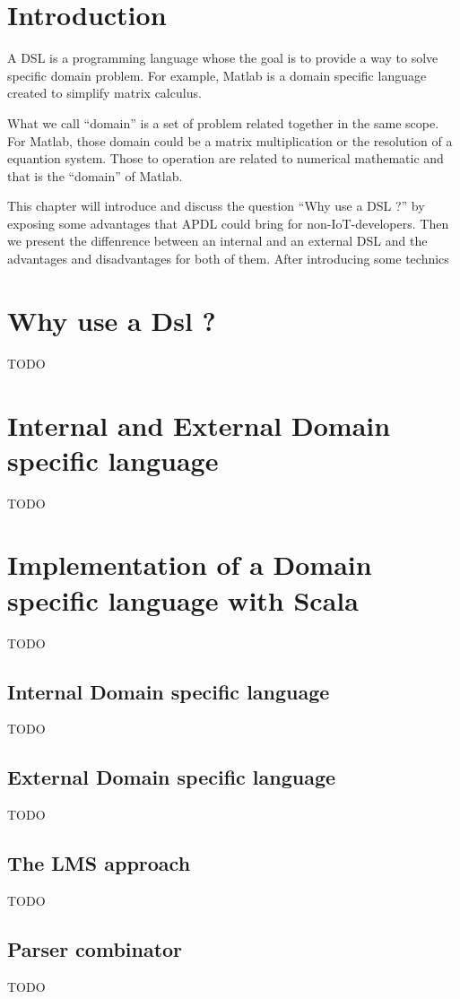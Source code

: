 \label{cha:a-dsl}

\section{Introduction}
\label{sec:dsl_intro}

A \gls{DSL} is a programming language whose the goal is
to provide a way to solve specific domain problem. For example, Matlab is a
domain specific language created to simplify matrix calculus.

What we call ``domain'' is a set of problem related together in the same scope.
For Matlab, those domain could be a matrix multiplication or the resolution of a
equantion system. Those to operation are related to numerical mathematic and
that is the ``domain'' of Matlab.

This chapter will introduce and discuss the question ``Why use a DSL ?'' by
exposing some advantages that \gls{APDL} could bring for non-IoT-developers.
Then we present the diffenrence between an internal and an external DSL and the
advantages and disadvantages for both of them. After introducing some technics

\section{Why use a Dsl ?}
\label{sec:why-use-dsl}

TODO

\section{Internal and External Domain specific language}
\label{sec:internal_and_external_dsl}

TODO

\section{Implementation of a Domain specific language with Scala}
\label{sec:implementation_of_a_dsl}

TODO

\subsection{Internal Domain specific language}
\label{subsec:scala_internal_dsl}

TODO

\subsection{External Domain specific language}
\label{subsec:scala_external_dsl}

TODO

\subsection{The LMS approach}
\label{subsec:lms_approach}

TODO

\subsection{Parser combinator}
\label{subsec:parser_combinator}

TODO

